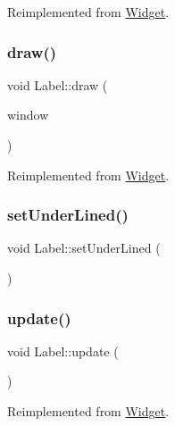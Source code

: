 Reimplemented from \mbox{\hyperlink{class_widget_a958763d528cd422de5f248d83530f68b}{Widget}}.

\mbox{\label{class_label_acaf5dfeeab3e46b5795b8cd24c9d94fe}} 
\subsubsection{\texorpdfstring{draw()}{draw()}}
{\footnotesize\ttfamily void Label\+::draw (\begin{DoxyParamCaption}\item[{sf\+::\+Render\+Window \&}]{window }\end{DoxyParamCaption})\hspace{0.3cm}{\ttfamily [virtual]}}



Reimplemented from \mbox{\hyperlink{class_widget_ae33a60123dee736ad8ece7277711f3d4}{Widget}}.

\mbox{\label{class_label_ab653e984b25c9669866924d83cb2bed8}} 
\subsubsection{\texorpdfstring{setUnderLined()}{setUnderLined()}}
{\footnotesize\ttfamily void Label\+::set\+Under\+Lined (\begin{DoxyParamCaption}{ }\end{DoxyParamCaption})}

\mbox{\label{class_label_a736aab0e4b280f1a3c86e1566b5eb235}} 
\subsubsection{\texorpdfstring{update()}{update()}}
{\footnotesize\ttfamily void Label\+::update (\begin{DoxyParamCaption}{ }\end{DoxyParamCaption})\hspace{0.3cm}{\ttfamily [virtual]}}



Reimplemented from \mbox{\hyperlink{class_widget_a38aacc92bda1a1e91052873a4a955487}{Widget}}.

